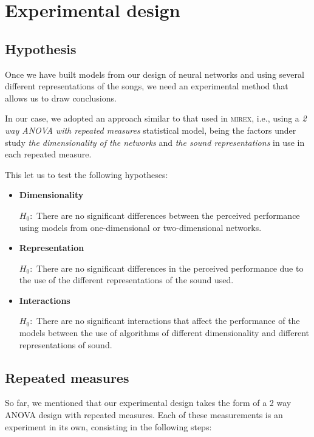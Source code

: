 \section{Experimental design}

\subsection{Hypothesis}

Once we have built models from our design of neural networks and using several different representations of the songs, we need an experimental method that allows us to draw conclusions.

In our case, we adopted an approach similar to that used in \textsc{mirex}, i.e., using a {\it 2 way ANOVA with repeated measures} statistical model, being the factors under study {\it the dimensionality of the networks} and {\it the sound representations} in use in each repeated measure.

This let us to test the following hypotheses:

\begin{itemize}
  \item {
    {\bf Dimensionality}

    $H_0:$ There are no significant differences between the perceived performance using models from one-dimensional or two-dimensional networks.
  }
  \item {
    {\bf Representation}

    $H_0:$ There are no significant differences in the perceived performance due to the use of the different representations of the sound used.

  }
  \item {
    {\bf Interactions}

    $H_0:$ There are no significant interactions that affect the performance of the models between the use of algorithms of different dimensionality and different representations of sound.
  }
\end{itemize}

\subsection{Repeated measures}

So far, we mentioned that our experimental design takes the form of a 2 way ANOVA design with repeated measures. Each of these measurements is an experiment in its own, consisting in the following steps:

